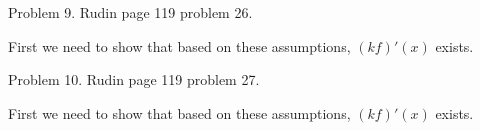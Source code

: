\documentclass{article}
\begin{document}
  \pagebreak

  {\Large \color{Sepia} Problem 9. Rudin page 119 problem 26. }

  \vspace{1cm}

  First we need to show that based on these assumptions, $(kf)'(x)$ exists.

  \pagebreak

  {\Large \color{Sepia} Problem 10. Rudin page 119 problem 27. }

  \vspace{1cm}

  First we need to show that based on these assumptions, $(kf)'(x)$ exists.

  \pagebreak
\end{document}

